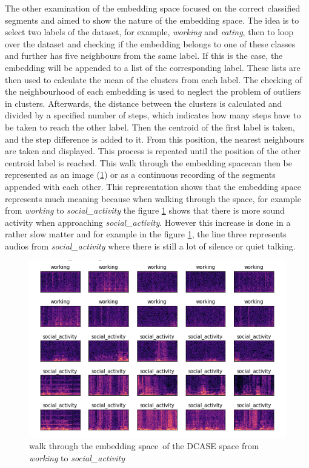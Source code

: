 \newline
\newline
The other examination of the embedding space focused on the correct classified segments and aimed to show the nature of the embedding space. The idea is to select two labels of the dataset, for example, \textit{working} and \textit{eating}, then to loop over the dataset and checking if the embedding belongs to one of these classes and further has five neighbours from the same label. If this is the case, the embedding will be appended to a list of the corresponding label. These lists are then used to calculate the mean of the clusters from each label. The checking of the neighbourhood of each embedding is used to neglect the problem of outliers in clusters. Afterwards, the distance between the clusters is calculated and divided by a specified number of steps, which indicates how many steps have to be taken to reach the other label. Then the centroid of the first label is taken, and the step difference is added to it. From this position, the nearest neighbours are taken and displayed. This process is repeated until the position of the other centroid label is reached. This \flqq walk through the embedding space\frqq can then be represented as an image (\ref{fig:Walk-through-DCASE}) or as a continuous recording of the segments appended with each other. This representation shows that the embedding space represents much meaning because when walking through the space, for example from \textit{working} to \textit{social\_activity} the figure \ref{fig:Walk-through-DCASE} shows that there is more sound activity when approaching \textit{social\_activity}. However this increase is done in a rather slow matter and for example in the figure \ref{fig:Walk-through-DCASE}, the line three represents audios from \textit{social\_activity} where there is still a lot of silence or quiet talking.
\begin{figure}[ht]
\captionsetup{format=plain}
\centering
    \includegraphics[width=0.8\linewidth]{img/Walk_through_dcase_space.png}
    \caption{\flqq walk through the embedding space\frqq \ of the DCASE space from \textit{working} to \textit{social\_activity}}
    \label{fig:Walk-through-DCASE}
\end{figure}

